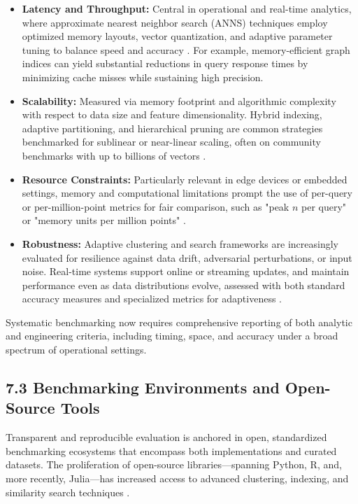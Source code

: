 \documentclass[11pt]{article}
\begin{document}
\begin{itemize}
    \item \textbf{Latency and Throughput:} Central in operational and real-time analytics, where approximate nearest neighbor search (ANNS) techniques employ optimized memory layouts, vector quantization, and adaptive parameter tuning to balance speed and accuracy \cite{ref59,ref60,ref109,ref117,ref118}. For example, memory-efficient graph indices can yield substantial reductions in query response times by minimizing cache misses while sustaining high precision.
    \item \textbf{Scalability:} Measured via memory footprint and algorithmic complexity with respect to data size and feature dimensionality. Hybrid indexing, adaptive partitioning, and hierarchical pruning are common strategies benchmarked for sublinear or near-linear scaling, often on community benchmarks with up to billions of vectors \cite{ref59,ref79,ref108,ref116}.
    \item \textbf{Resource Constraints:} Particularly relevant in edge devices or embedded settings, memory and computational limitations prompt the use of per-query or per-million-point metrics for fair comparison, such as "peak $n$ per query" or "memory units per million points" \cite{ref60,ref79,ref86,ref87}.
    \item \textbf{Robustness:} Adaptive clustering and search frameworks are increasingly evaluated for resilience against data drift, adversarial perturbations, or input noise. Real-time systems support online or streaming updates, and maintain performance even as data distributions evolve, assessed with both standard accuracy measures and specialized metrics for adaptiveness \cite{ref64,ref108,ref110}.
\end{itemize}

Systematic benchmarking now requires comprehensive reporting of both analytic and engineering criteria, including timing, space, and accuracy under a broad spectrum of operational settings.

\subsection{7.3 Benchmarking Environments and Open-Source Tools}

Transparent and reproducible evaluation is anchored in open, standardized benchmarking ecosystems that encompass both implementations and curated datasets. The proliferation of open-source libraries—spanning Python, R, and, more recently, Julia—has increased access to advanced clustering, indexing, and similarity search techniques \cite{ref14,ref21,ref22,ref27,ref28,ref30,ref33,ref36,ref37,ref38,ref39,ref40,ref44,ref46,ref64,ref68,ref75,ref80,ref81,ref86,ref87,ref91,ref92,ref93,ref94,ref95,ref99,ref100,ref110}.
\end{document}
